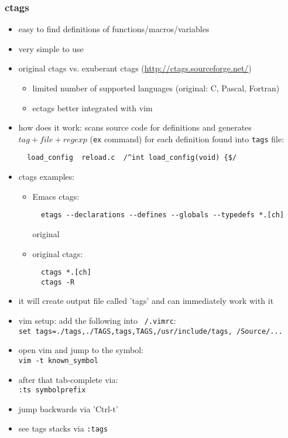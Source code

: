 \subsubsection{ctags}

\begin{itemize}
  \item easy to find definitions of functions/macros/variables
  \item very simple to use
  \item original ctags vs. exuberant ctags (\url{http://ctags.sourceforge.net/})
    \begin{itemize}
    \item limited number of supported languages (original: C, Pascal, Fortran)
    \item ectags better integrated with vim
    \end{itemize}
  \item how does it work: scans source code for definitions and generates
  $tag+file+regexp$ (\texttt{ex} command) for each definition found into
  \texttt{tags} file:
  \begin{verbatim}
  load_config  reload.c  /^int load_config(void) {$/
  \end{verbatim}
\end{itemize}

\begin{itemize}
  \item ctags examples:
  \begin{itemize}
  \item Emacs ctags:
\begin{verbatim}
  etags --declarations --defines --globals --typedefs *.[ch]
\end{verbatim}
  original \item original ctags:
\begin{verbatim}
  ctags *.[ch]
  ctags -R
\end{verbatim}
  \end{itemize}
  \item it will create output file called 'tags' and can immediately work
        with it
  \item vim setup: add the following into \texttt{~/.vimrc}:\\
  \texttt{set tags=./tags,./TAGS,tags,TAGS,/usr/inc{}lude/tags,~/Source/...}
  \item open vim and jump to the symbol: \\
     \texttt{vim -t known\_symbol}
  \item after that tab-complete via: \\
     \texttt{:ts symbolprefix}
  \item jump backwards via 'Ctrl-t'
  \item see tags stacks via \texttt{:tags}
\end{itemize}


